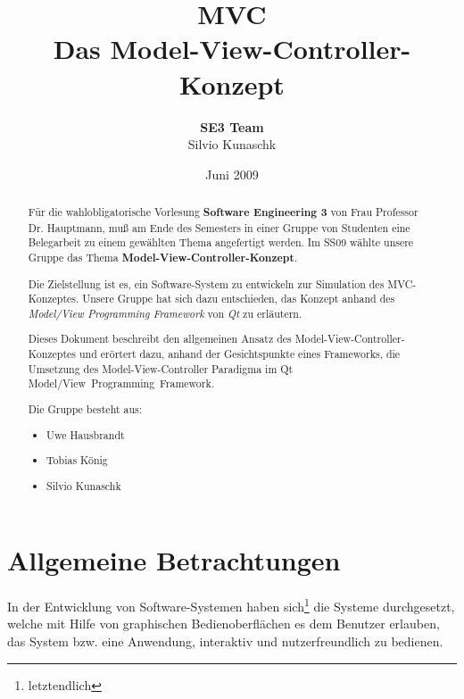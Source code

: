 \documentclass[11pt,a4paper,titlepage]{scrreprt}
\begin{document}
\selectlanguage{\german}

\title{{\Huge \bf MVC}\\[0.55em]{\LARGE Das Model-View-Controller-Konzept}}
\author{{\bf SE3 Team}\\Silvio Kunaschk}

\date{Juni 2009}
\maketitle

\begin{abstract}
Für die wahlobligatorische Vorlesung {\bf Software Engineering 3} von
Frau Professor Dr. Hauptmann, muß am Ende des Semesters in einer 
Gruppe von Studenten eine Belegarbeit zu einem gewählten Thema
angefertigt werden. Im SS09 wählte unsere Gruppe das Thema
{\bf Model-View-Controller-Konzept}.\\{\smallskip}

Die Zielstellung ist es, ein Software-System zu entwickeln zur Simulation
des MVC-Konzeptes. Unsere Gruppe hat sich dazu entschieden, das Konzept
anhand des {\itshape Model/View Programming Framework} von {\itshape Qt}
zu erläutern.\\{\smallskip}

Dieses Dokument beschreibt den allgemeinen Ansatz des 
Model-View-Controller-Konzeptes und erörtert dazu, anhand der Gesichtspunkte
eines Frameworks, die Umsetzung des Model-View-Controller Paradigma im
Qt Model/View~Programming~Framework.\\{\bigskip}

Die Gruppe besteht aus:
\begin{itemize}
\item Uwe Hausbrandt
\item Tobias König
\item Silvio Kunaschk
\end{itemize}

\end{abstract}

\tableofcontents

\chapter{Allgemeine Betrachtungen}
In der Entwicklung von Software-Systemen haben sich\footnote{letztendlich} die Systeme durchgesetzt, 
welche mit Hilfe von graphischen Bedienoberflächen es dem Benutzer erlauben, das System
bzw. eine Anwendung, interaktiv und nutzerfreundlich zu bedienen.\\
\end{document}
